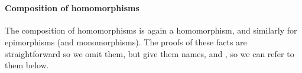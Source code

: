 \begin{code}
\AgdaSpace{}%
\AgdaSpace{}%
\AgdaFunction{]}\AgdaSpace{}%
\AgdaSpace{}%
\AgdaSpace{}%
\AgdaSpace{}%
\<%
\\
%
\>[1]\AgdaSpace{}%
\AgdaSymbol{(}\AgdaSpace{}%
\AgdaOperator{\AgdaInductiveConstructor{,}}\AgdaSpace{}%
\AgdaSymbol{)}\AgdaSpace{}%
\AgdaSymbol{=}\AgdaSpace{}%
\AgdaSymbol{(}\AgdaSpace{}%
\AgdaOperator{\AgdaInductiveConstructor{,}}\AgdaSpace{}%
\AgdaSpace{}%
\AgdaSymbol{)}\AgdaSpace{}%
\AgdaOperator{\AgdaInductiveConstructor{,}}\AgdaSpace{}%
\AgdaSpace{}%
\<%
\end{code}

\paragraph*{Composition of homomorphisms}
\fi      %
The composition of homomorphisms is again a homomorphism, and similarly for epimorphisms (and monomorphisms).
\ifshort
The proofs of these facts are straightforward so we omit them, but give them names,
 and , so we can refer to them below.
\else


